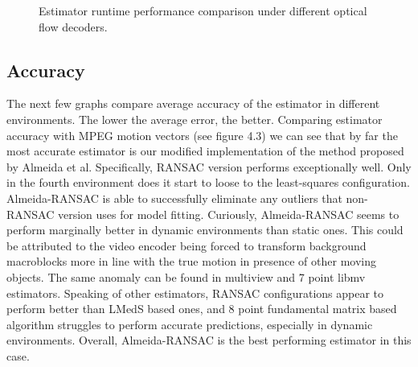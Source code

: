 \documentclass[11pt,english]{report}
\newcommand{\getstat}[1]{docs/statistics/#1}
\newcommand{\statplot}[4]{
	\addplot[#3, mark = #4, thick, smooth, mark size = 2, mark options={fill=#3}] table [y=#2, col sep=comma] {\getstat{#1}};
}
\begin{document}
\begin{figure}[!ht]
\begin{center}
\end{center}
\caption{\centering Estimator runtime performance comparison under different optical flow decoders.}
\end{figure}

\subsection{Accuracy}

The next few graphs compare average accuracy of the estimator in different environments. The lower the average error, the better. Comparing estimator accuracy with MPEG motion vectors (see figure 4.3) we can see that by far the most accurate estimator is our modified implementation of the method proposed by Almeida et al. Specifically, RANSAC version performs exceptionally well. Only in the fourth environment does it start to loose to the least-squares configuration. Almeida-RANSAC is able to successfully eliminate any outliers that non-RANSAC version uses for model fitting. Curiously, Almeida-RANSAC seems to perform marginally better in dynamic environments than static ones. This could be attributed to the video encoder being forced to transform background macroblocks more in line with the true motion in presence of other moving objects. The same anomaly can be found in multiview and 7 point libmv estimators. Speaking of other estimators, RANSAC configurations appear to perform better than LMedS based ones, and 8 point fundamental matrix based algorithm struggles to perform accurate predictions, especially in dynamic environments. Overall, Almeida-RANSAC is the best performing estimator in this case.
\end{document}
